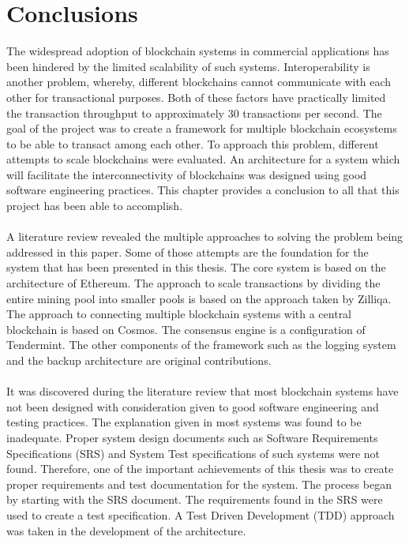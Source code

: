 \documentclass[a4paper,twoside,phd]{BYUPhys}
\begin{document}
\chapter{Conclusions}
The widespread adoption of blockchain systems in commercial applications has been hindered by the limited scalability of such systems\cite{GavinWood2018POLKADOT:FRAMEWORK}. Interoperability is another problem, whereby, different blockchains cannot communicate with each other for transactional purposes\cite{GavinWood2018POLKADOT:FRAMEWORK}. Both of these factors have practically limited the transaction throughput to approximately 30 transactions per second\cite{GavinWood2018POLKADOT:FRAMEWORK}. The goal of the project was to create a framework for multiple blockchain ecosystems to be able to transact among each other. To approach this problem, different attempts to scale blockchains were evaluated. An architecture for a system which will facilitate the interconnectivity of blockchains was designed using good software engineering practices. This chapter provides a conclusion to all that this project has been able to accomplish.  
\\
\\
A literature review revealed the multiple approaches to solving the problem being addressed in this paper. Some of those attempts are the foundation for the system that has been presented in this thesis. The core system is based on the architecture of Ethereum. The approach to scale transactions by dividing the entire mining pool into smaller pools is based on the approach taken by Zilliqa. The approach to connecting multiple blockchain systems with a central blockchain is based on Cosmos. The consensus engine is a configuration of Tendermint. The other components of the framework such as the logging system and the backup architecture are original contributions.
\\
\\
It was discovered during the literature review that most blockchain systems have not been designed with consideration given to good software engineering and testing practices. The explanation given in most systems was found to be inadequate. Proper system design documents such as Software Requirements Specifications (SRS) and System Test specifications of such systems were not found. Therefore, one of the important achievements of this thesis was to create proper requirements and test documentation for the system. The process began by starting with the SRS document. The requirements found in the SRS were used to create a test specification.  A Test Driven Development (TDD) approach was taken in the development of the architecture.
\end{document}

